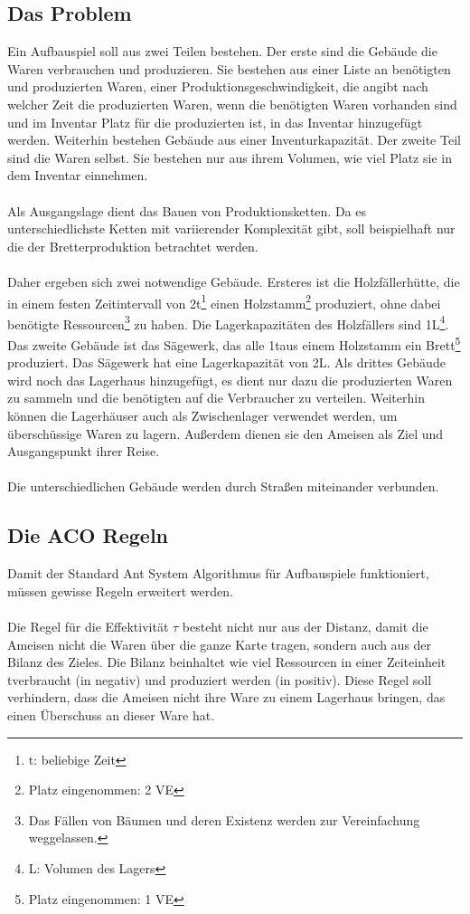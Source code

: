 \documentclass[12pt]{article}
\begin{document}
\subsection{Das Problem}
Ein Aufbauspiel soll aus zwei Teilen bestehen. Der erste sind die Gebäude die Waren verbrauchen und produzieren. Sie bestehen aus einer Liste an benötigten und produzierten Waren, einer Produktionsgeschwindigkeit, die angibt nach welcher Zeit die produzierten Waren, wenn die benötigten Waren vorhanden sind und im Inventar Platz für die produzierten ist, in das Inventar hinzugefügt werden. Weiterhin bestehen Gebäude aus einer Inventurkapazität.
Der zweite Teil sind die Waren selbst. Sie bestehen nur aus ihrem Volumen, wie viel Platz sie in dem Inventar einnehmen.\\\\
Als Ausgangslage dient das Bauen von Produktionsketten. Da es unterschiedlichste Ketten mit variierender Komplexität gibt, soll beispielhaft nur die der Bretterproduktion betrachtet werden.\\\\
Daher ergeben sich zwei notwendige Gebäude. Ersteres ist die Holzfällerhütte, die in einem festen Zeitintervall von 2t\footnote{t: beliebige Zeit} einen Holzstamm\footnote{Platz eingenommen: 2 VE} produziert, ohne dabei benötigte Ressourcen\footnote{Das Fällen von Bäumen und deren Existenz werden zur Vereinfachung weggelassen.} zu haben. Die Lagerkapazitäten des Holzfällers sind 1L\footnote{L: Volumen des Lagers}. Das zweite Gebäude ist das Sägewerk, das alle 1t\footnotemark[3] aus einem Holzstamm ein Brett\footnote{Platz eingenommen: 1 VE} produziert. Das Sägewerk hat eine Lagerkapazität von 2L\footnotemark[6]. 
Als drittes Gebäude wird noch das Lagerhaus hinzugefügt, es dient nur dazu die produzierten Waren zu sammeln und die benötigten auf die Verbraucher zu verteilen. Weiterhin können die Lagerhäuser auch als Zwischenlager verwendet werden, um überschüssige Waren zu lagern. Außerdem dienen sie den Ameisen als Ziel und Ausgangspunkt ihrer Reise.\\\\
Die unterschiedlichen Gebäude werden durch Straßen miteinander verbunden.
\subsection{Die ACO Regeln}\label{Regeln}
Damit der Standard Ant System Algorithmus für Aufbauspiele funktioniert, müssen gewisse Regeln erweitert werden. \\\\
Die Regel für die Effektivität $\tau$ besteht nicht nur aus der Distanz, damit die Ameisen nicht die Waren über die ganze Karte tragen, sondern auch aus der Bilanz des Zieles. Die Bilanz beinhaltet wie viel Ressourcen in einer Zeiteinheit t\footnotemark[3] verbraucht (in negativ) und produziert werden (in positiv). Diese Regel soll verhindern, dass die Ameisen nicht ihre Ware zu einem Lagerhaus bringen, das einen Überschuss an dieser Ware hat.
\end{document}
